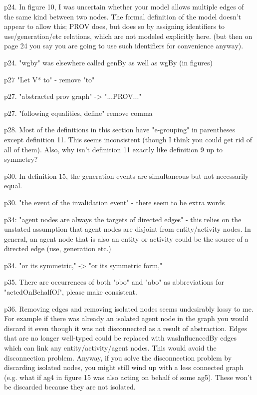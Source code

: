 \documentclass{article}
\newcommand{\showComments}{yes} %
\newcommand{\com}[2]{\ifthenelse{\equal{\showComments}{yes}}{\textcolor{#1}{#2}}{}}
\newcommand{\comment}[1]{\com{red}{#1}}
\begin{document}
\comment{Paolo - would this be a helpful way to look at it?}

p24. In figure 10, I was uncertain whether your model allows multiple edges of the same kind between two nodes.  The formal definition of the model doesn't appear to allow this; PROV does, but does so by assigning identifiers to use/generation/etc relations, which are not modeled explicitly here.  (but then on page 24 you say you are going to use such identifiers for convenience anyway).



p24. "wgby" was elsewhere called genBy as well as wgBy (in figures)

p27 "Let V* to" - remove "to"

p27.  "abstracted prov graph" -> "...PROV..."

p27.  "following equalities, define" remove comma

p28. Most of the definitions in this section have "e-grouping" in parentheses except definition 11.  This seems inconsistent (though I think you could get rid of all of them).  Also, why isn't definition 11 exactly like definition 9 up to symmetry?

\comment{Don't know..}

p30.  In definition 15, the generation events are simultaneous but not necessarily equal. 

p30. "the event of the invalidation event" - there seem to be extra words

p34: "agent nodes are always the targets of directed edges" - this relies on the unstated assumption that agent nodes are disjoint from entity/activity nodes.  In general, an agent node that is also an entity or activity could be the source of a directed edge (use, generation etc.)

\comment{must make this assumption clear}

p34. "or its symmetric," -> "or its symmetric form,"

p35.  There are occurrences of both "obo" and "abo" as abbreviations for "actedOnBehalfOf", please make consistent.



p36.  Removing edges and removing isolated nodes seems undesirably lossy to me.   For example if there was already an isolated agent node in the graph you would discard it even though it was not disconnected as a result of abstraction.
\comment{good point}
Edges that are no longer well-typed could be replaced with wasInfluencedBy edges which can link any entity/activity/agent nodes.  This would avoid the disconnection problem.
Anyway, if you solve the disconnection problem by discarding isolated nodes, you might still wind up with a less connected graph (e.g. what if ag4 in figure 15 was also acting on behalf of some ag5). These won't be discarded because they are not isolated.
\comment{not sure how to solve this one}
\end{document}
